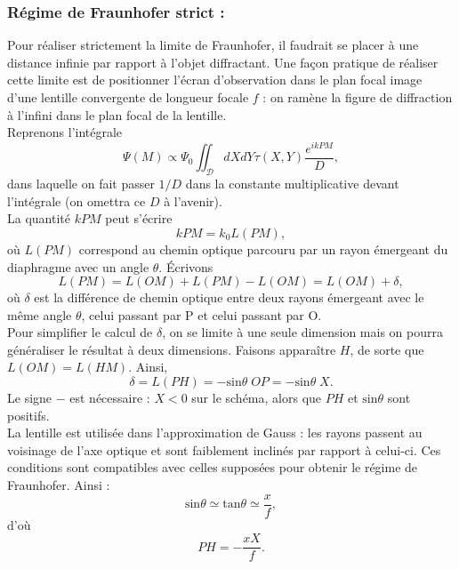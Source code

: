 \documentclass[11pt,a4paper]{report}
\begin{document}
\subsubsection{Régime de Fraunhofer strict :}

Pour réaliser strictement la limite de Fraunhofer, il faudrait se placer à une distance infinie par rapport à l'objet diffractant. Une façon pratique de réaliser cette limite est de positionner l'écran d'observation dans le plan focal image d'une lentille convergente de longueur focale $f$ : on ramène la figure de diffraction à l'infini dans le plan focal de la lentille.\\

Reprenons l'intégrale
\begin{equation}
	\Psi(M) \propto \Psi_0 \iint_\mathcal{D} dXdY \tau(X,Y) \frac{\displaystyle{e^{ikPM}}}{D},
\end{equation}
dans laquelle on fait passer $1/D$ dans la constante multiplicative devant l'intégrale (on omettra ce $D$ à l'avenir).\\

La quantité $kPM$ peut s'écrire
\begin{equation}
	k PM = k_0 L(PM),
\end{equation}
où $L(PM)$ correspond au chemin optique parcouru par un rayon émergeant du diaphragme avec un angle $\theta$. \'Ecrivons
\begin{equation}
	L(PM) = L(OM) + L(PM) - L(OM) = L(OM) + \delta,
\end{equation}
où $\delta$ est la différence de chemin optique entre deux rayons émergeant avec le même angle $\theta$, celui passant par P et celui passant par O.\\

Pour simplifier le calcul de $\delta$, on se limite à une seule dimension mais on pourra généraliser le résultat à deux dimensions. Faisons apparaître $H$, de sorte que $L(OM) = L(HM)$. Ainsi,
\begin{equation}
	\delta = L(PH) = - \text{sin}\theta\;OP = - \text{sin}\theta\;X.
\end{equation}
Le signe $-$ est nécessaire : $X < 0$ sur le schéma, alors que $PH$ et $\text{sin}\theta$ sont positifs.\\

La lentille est utilisée dans l'approximation de Gauss : les rayons passent au voisinage de l'axe optique et sont faiblement inclinés par rapport à celui-ci. Ces conditions sont compatibles avec celles supposées pour obtenir le régime de Fraunhofer. Ainsi : 
\begin{equation}
	\text{sin}\theta \simeq \text{tan}\theta \simeq \frac{x}{f},
\end{equation}
d'où
\begin{equation}
	PH = - \frac{xX}{f}.
\end{equation}
\end{document}

